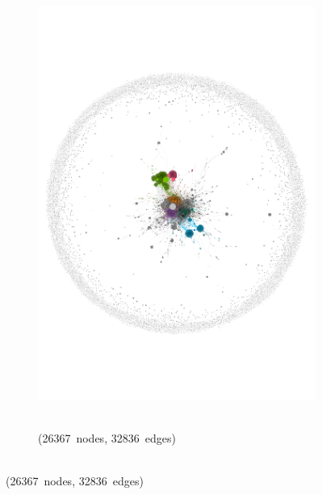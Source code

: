 \documentclass[
  a4paper,
  abstract=on,
  captions=tableabove
  ]{scrartcl}
\begin{document}
\begin{figure}
\begin{subfigure}{.45\linewidth}
          \includegraphics[width=\linewidth, height=\textheight, keepaspectratio]{img/net_solopreneur_four.pdf}
        \end{subfigure}
        \begin{subfigure}{.45\linewidth}
          \caption{\\ (\num{26367}~nodes, \num{32836}~edges)}
          \label{subfig:net_last_cases_alt-left}

\end{subfigure}
\end{figure}
\end{document}
